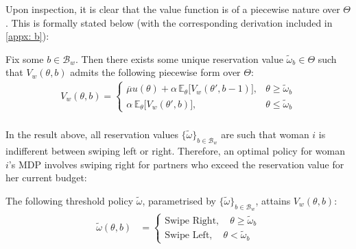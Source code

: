 Upon inspection, it is clear that the value function is of a piecewise nature over $\Theta$. This is formally stated below (with the corresponding derivation included in \autoref{appx: b}): 
\begin{proposition}\label{prop:piecewiseV}
Fix some $b\in\mathcal{B}_w$. Then there exists some unique reservation value $\widetilde{\omega}_b\in \Theta$ such that $V_w(\theta,b)$ admits the following piecewise form over $\Theta$:  
\begin{equation*}
    \begin{split}
        V_w(\theta,b)=\begin{cases}
            \overline\mu u(\theta) +\alpha \,\mathbb{E}_{\theta}\Big[V_w(\theta', b-1)\Big],& \theta \geq \widetilde \omega_b \\[10pt]
            \alpha \,\mathbb{E}_{\theta}\Big[V_w(\theta', b)\Big],& \theta\leq\widetilde \omega_b
        \end{cases}\\[8pt]  
    \end{split}
\end{equation*} 
\end{proposition}  

In the result above, all reservation values $\{\widetilde\omega\}_{b\in \mathcal{B}_w}$ are such that woman $i$ is indifferent between swiping left or right. Therefore, an optimal policy for woman $i$'s MDP involves swiping right for partners who exceed the reservation value for her current budget:  
\begin{corollary}\label{cor:optpolicy}
    The following threshold policy $\widetilde\omega$, parametrised by $\{\widetilde\omega\}_{b\in \mathcal{B}_w}$, attains $V_w(\theta,b)$:
    \begin{equation*}
        \begin{split}
            \widetilde\omega(\theta,b)&=\begin{cases}
                \text{Swipe Right},\quad \theta\geq \widetilde{\omega}_b \\ 
                \text{Swipe Left}, \quad\theta< \widetilde\omega _b  
            \end{cases}   
        \end{split}
    \end{equation*} 
\end{corollary} 


